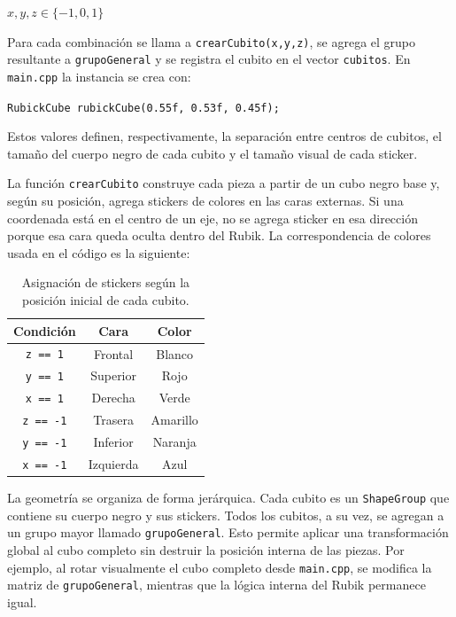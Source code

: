 \documentclass[12pt,a4paper]{article}
\begin{document}
\begin{center}
$x,y,z \in \{-1,0,1\}$
\end{center}

Para cada combinación se llama a \texttt{crearCubito(x,y,z)}, se agrega el grupo resultante a \texttt{grupoGeneral} y se registra el cubito en el vector \texttt{cubitos}. En \texttt{main.cpp} la instancia se crea con:

\begin{center}
\texttt{RubickCube rubickCube(0.55f, 0.53f, 0.45f);}
\end{center}

Estos valores definen, respectivamente, la separación entre centros de cubitos, el tamaño del cuerpo negro de cada cubito y el tamaño visual de cada sticker.

La función \texttt{crearCubito} construye cada pieza a partir de un cubo negro base y, según su posición, agrega stickers de colores en las caras externas. Si una coordenada está en el centro de un eje, no se agrega sticker en esa dirección porque esa cara queda oculta dentro del Rubik. La correspondencia de colores usada en el código es la siguiente:

\begin{table}[H]
\centering
\begin{tabular}{|c|c|c|}
\hline
\textbf{Condición} & \textbf{Cara} & \textbf{Color} \\ \hline
\texttt{z == 1} & Frontal & Blanco \\ \hline
\texttt{y == 1} & Superior & Rojo \\ \hline
\texttt{x == 1} & Derecha & Verde \\ \hline
\texttt{z == -1} & Trasera & Amarillo \\ \hline
\texttt{y == -1} & Inferior & Naranja \\ \hline
\texttt{x == -1} & Izquierda & Azul \\ \hline
\end{tabular}
\caption{Asignación de stickers según la posición inicial de cada cubito.}
\end{table}

La geometría se organiza de forma jerárquica. Cada cubito es un \texttt{ShapeGroup} que contiene su cuerpo negro y sus stickers. Todos los cubitos, a su vez, se agregan a un grupo mayor llamado \texttt{grupoGeneral}. Esto permite aplicar una transformación global al cubo completo sin destruir la posición interna de las piezas. Por ejemplo, al rotar visualmente el cubo completo desde \texttt{main.cpp}, se modifica la matriz de \texttt{grupoGeneral}, mientras que la lógica interna del Rubik permanece igual.
\end{document}
